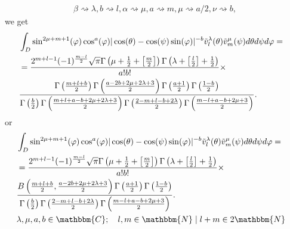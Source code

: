 \documentclass{article}
\newcommand{\nobracket}{}
\begin{document}
\begin{answer}
\begin{eqnarray}
    & \beta \rightsquigarrow \lambda, b \rightsquigarrow l, \alpha
    \rightsquigarrow \mu, a \rightsquigarrow m, \mu \rightsquigarrow a / 2,
    \nu \rightsquigarrow b, &  \nonumber
  \end{eqnarray}
  we get
  \begin{eqnarray}
    & \int_D \sin^{2 \mu + m + 1} (\varphi) \cos^a (\varphi) | \cos (\theta)
    - \cos (\psi) \sin (\varphi) |^{- b} \tilde{v}^{\lambda}_l (\theta)
    \tilde{v}^{\mu}_m (\psi) d \theta d \psi d \varphi = \hspace*{\fill} & 
    \nonumber\\
    & = \frac{2^{m + l - 1} (- 1)^{\frac{m - l}{2}} \sqrt{\pi} \Gamma \left(
    \mu + \frac{1}{2} + \left[ \frac{m}{2} \right] \right) \Gamma \left(
    \lambda + \left[ \frac{l}{2} \right] + \frac{1}{2} \right)}{a! b!}
    \nobracket \nobracket \times  \label{eq-2} & \\
    & \frac{\Gamma \left( \frac{m + l + b}{2} \right) \Gamma \left( \frac{a -
    2 b + 2 \mu + 2 \lambda + 3}{2} \right) \Gamma \left( \frac{a + 1}{2}
    \right) \Gamma \left( \frac{1 - b}{2} \right)}{\Gamma \left( \frac{b}{2}
    \right) \Gamma \left( \frac{m + l + a - b + 2 \mu + 2 \lambda + 3}{2}
    \right) \Gamma \left( \frac{2 - m + l - b + 2 \lambda}{2} \right) \Gamma
    \left( \frac{m - l + a - b + 2 \mu + 3}{2} \right)} . &  \nonumber
  \end{eqnarray}
  or
  \begin{eqnarray}
    & \int_D \sin^{2 \mu + m + 1} (\varphi) \cos^a (\varphi) | \cos (\theta)
    - \cos (\psi) \sin (\varphi) |^{- b} \tilde{v}^{\lambda}_l (\theta)
    \tilde{v}^{\mu}_m (\psi) d \theta d \psi d \varphi = \hspace*{\fill} & 
    \nonumber\\
    & = \frac{2^{m + l - 1} (- 1)^{\frac{m - l}{2}} \sqrt{\pi} \Gamma \left(
    \mu + \frac{1}{2} + \left[ \frac{m}{2} \right] \right) \Gamma \left(
    \lambda + \left[ \frac{l}{2} \right] + \frac{1}{2} \right)}{a! b!}
    \nobracket \nobracket \times &  \nonumber\\
    & \frac{B \left( \frac{m + l + b}{2}, \frac{a - 2 b + 2 \mu + 2 \lambda +
    3}{2} \right) \Gamma \left( \frac{a + 1}{2} \right) \Gamma \left( \frac{1
    - b}{2} \right)}{\Gamma \left( \frac{b}{2} \right) \Gamma \left( \frac{2 -
    m + l - b + 2 \lambda}{2} \right) \Gamma \left( \frac{m - l + a - b + 2
    \mu + 3}{2} \right)} . &  \nonumber\\
    & \lambda, \mu, a, b \in \mathbbm{C}; \quad l, m \in \mathbbm{N} \mid l +
    m \in 2\mathbbm{N} &  \nonumber
  \end{eqnarray}
\end{answer}
\end{document}
